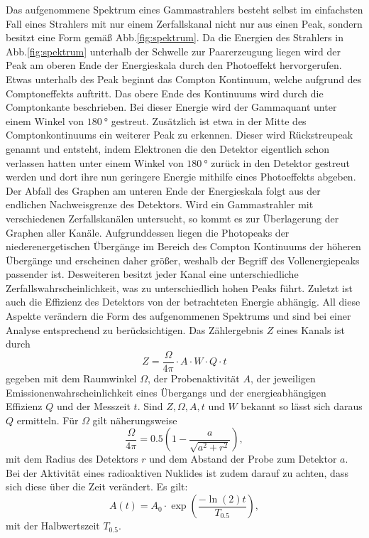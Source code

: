 Das aufgenommene Spektrum eines Gammastrahlers besteht selbst im einfachsten Fall eines Strahlers mit nur einem Zerfallskanal nicht nur aus einen Peak, sondern besitzt eine Form gemäß Abb.\ref{fig:spektrum}. Da die Energien des Strahlers in Abb.\ref{fig:spektrum} unterhalb der Schwelle zur Paarerzeugung liegen wird der Peak am oberen Ende der Energieskala durch den Photoeffekt hervorgerufen. Etwas unterhalb des Peak beginnt das Compton Kontinuum, welche aufgrund des Comptoneffekts auftritt. Das obere Ende des Kontinuums wird durch die Comptonkante beschrieben. Bei dieser Energie wird der Gammaquant unter einem Winkel von $\SI{180}{\degree}$ gestreut. Zusätzlich ist etwa in der Mitte des Comptonkontinuums ein weiterer Peak zu erkennen. Dieser wird Rückstreupeak genannt und entsteht, indem Elektronen die den Detektor eigentlich schon verlassen hatten unter einem Winkel von $\SI{180}{\degree}$ zurück in den Detektor gestreut werden und dort ihre nun geringere Energie mithilfe eines Photoeffekts abgeben. Der Abfall des Graphen am unteren Ende der Energieskala folgt aus der endlichen Nachweisgrenze des Detektors. Wird ein Gammastrahler mit verschiedenen Zerfallskanälen untersucht, so kommt es zur Überlagerung der Graphen aller Kanäle. Aufgrunddessen liegen die Photopeaks der niederenergetischen Übergänge im Bereich des Compton Kontinuums der höheren Übergänge und erscheinen daher größer, weshalb der Begriff des Vollenergiepeaks passender ist. Desweiteren besitzt jeder Kanal eine unterschiedliche Zerfallswahrscheinlichkeit, was zu unterschiedlich hohen Peaks führt. Zuletzt ist auch die Effizienz des Detektors von der betrachteten Energie abhängig. All diese Aspekte verändern die Form des aufgenommenen Spektrums und sind bei einer Analyse entsprechend zu berücksichtigen. Das Zählergebnis $Z$ eines Kanals ist durch
\begin{equation}
    Z = \frac{\Omega}{4 \pi}\cdot A \cdot W \cdot Q \cdot t \label{eq:ZZZ}
\end{equation}
gegeben mit dem Raumwinkel $\Omega$, der Probenaktivität $A$, der jeweiligen Emissionenwahrscheinlichkeit eines Übergangs und der energieabhängigen Effizienz $Q$ und der Messzeit $t$. Sind $Z,\Omega,A,t$ und $W$ bekannt so lässt sich daraus $Q$ ermitteln. Für $\Omega$ gilt näherungsweise
\begin{equation}
    \frac{\Omega}{4 \pi} = 0.5 \left( 1- \frac{a}{\sqrt{a^2 + r^2}}\right) ,\label{eq:omega}
\end{equation}
mit dem Radius des Detektors $r$ und dem Abstand der Probe zum Detektor $a$. 
Bei der Aktivität eines radioaktiven Nuklides ist zudem darauf zu achten, dass sich diese über die Zeit verändert. Es gilt:
\begin{equation}
    A(t) = A_0 \cdot \exp\left(\frac{-\ln(2) t }{T_{0.5}}\right), \label{eq:AAA}
\end{equation}
mit der Halbwertszeit $T_{0.5}$.